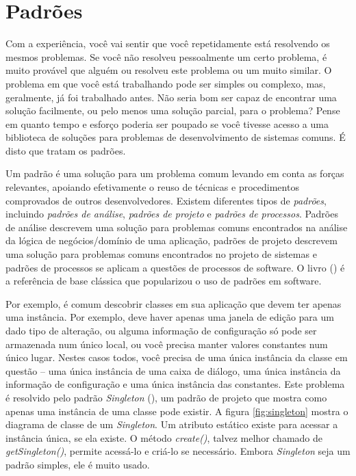 \documentclass[
	11pt,				%
	openright,
	twoside,			%
	a4paper,			%
	english,			%
	french,
	brazil,				%
	sumario=tradicional
	]{abntex2}
\begin{document}
\section{Padrões}

Com a experiência, você vai sentir que você repetidamente está resolvendo os mesmos problemas. Se você não resolveu pessoalmente um certo problema, é muito provável que alguém ou resolveu este problema ou um muito similar. O problema em que você está trabalhando pode ser simples ou complexo, mas, geralmente, já foi trabalhado antes. Não seria bom ser capaz de encontrar uma solução facilmente, ou pelo menos uma solução parcial, para o problema? Pense em quanto tempo e esforço poderia ser poupado se você tivesse acesso a uma biblioteca de soluções para problemas de desenvolvimento de sistemas comuns. É disto que tratam os padrões.

Um padrão é uma solução para um problema comum levando em conta as forças relevantes, apoiando efetivamente o reuso de técnicas e procedimentos comprovados de outros desenvolvedores. Existem diferentes tipos de \emph{padrões}, incluindo \emph{padrões de análise}, \emph{padrões de projeto} e \emph{padrões de processos}. Padrões de análise descrevem uma solução para problemas comuns encontrados na análise da lógica de negócios/domínio de uma aplicação, padrões de projeto descrevem uma solução para problemas comuns encontrados no projeto de sistemas e padrões de processos se aplicam a questões de processos de software. O livro () é a referência de base clássica que popularizou o uso de padrões em software.

Por exemplo, é comum descobrir classes em sua aplicação que devem ter apenas uma instância. Por exemplo, deve haver apenas uma janela de edição para um dado tipo de alteração, ou alguma informação de configuração só pode ser armazenada num único local, ou você precisa manter valores constantes num único lugar. Nestes casos todos, você precisa de uma única instância da classe em questão -- uma única instância de uma caixa de diálogo, uma única instância da informação de configuração e uma única instância das constantes. Este problema é resolvido pelo padrão \emph{Singleton} (), um padrão de projeto que mostra como apenas uma instância de uma classe pode existir. A figura \ref{fig:singleton} mostra o diagrama de classe de um \emph{Singleton}. Um atributo estático existe para acessar a instância única, se ela existe. O método \emph{create()}, talvez melhor chamado de \emph{getSingleton()}, permite acessá-lo e criá-lo se necessário. Embora \emph{Singleton} seja um padrão simples, ele é muito usado.
\end{document}
